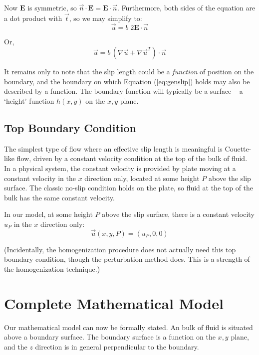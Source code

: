 \documentclass[12pt, a4paper, twoside, openright]{book}
\begin{document}
Now $\mathbf{E}$ is symmetric, so $\vec{n} \cdot \mathbf{E} = \mathbf{E} \cdot \vec{n}$.  Furthermore, both sides of the equation are a dot product with $\vec{t}$, so we may simplify to:
\begin{equation}
\vec{u} = b \; 2 \mathbf{E} \cdot \vec{n}
\end{equation}

Or,
\begin{equation}
\vec{u} = b \, (\nabla \vec{u} + \nabla \vec{u}^T) \cdot \vec{n}
\label{eq:genslip}
\end{equation}


\vspace{1em}

It remains only to note that the slip length could be a \emph{function} of position on the boundary, and the boundary on which Equation (\ref{eq:genslip}) holds may also be described by a function. The boundary function will typically be a surface -- a `height' function $h(x,y)$ on the $x,y$ plane.


\subsection{Top Boundary Condition}

The simplest type of flow where an effective slip length is meaningful is Couette-like flow, driven by a constant velocity condition at the top of the bulk of fluid.  In a physical system, the constant velocity is provided by plate moving at a constant velocity in the $x$ direction only, located at some height $P$ above the slip surface.  The classic no-slip condition holds on the plate, so fluid at the top of the bulk has the same constant velocity.

In our model, at some height $P$ above the slip surface, there is a constant velocity $u_P$ in the $x$ direction only:
\begin{equation}
\vec{u}(x,y,P) = (u_P,0,0)
\end{equation}

(Incidentally, the homogenization procedure does not actually need this top boundary condition, though the perturbation method does.  This is a strength of the homogenization technique.)

\section{Complete Mathematical Model}

Our mathematical model can now be formally stated.  An bulk of fluid is situated above a boundary surface.  
The boundary surface is a function on the $x,y$ plane, and the $z$ direction is in general perpendicular to the boundary.
\end{document}
